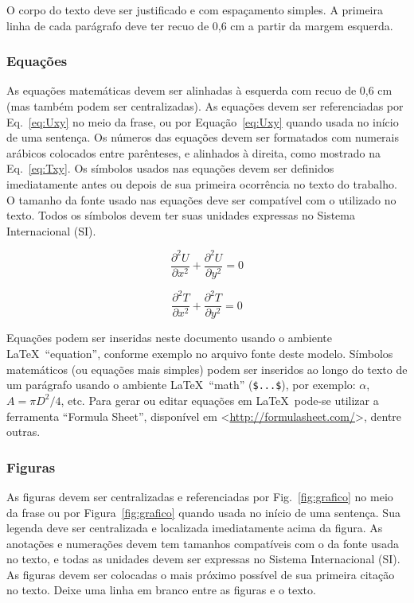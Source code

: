 \documentclass[%
  report,%
  10pt,%
  a4paper,%
  fleqn,%
  oneside,%
  sumario = tradicional,%
  chapter = TITLE,%
  section = TITLE,%
]{abntex2}
\begin{document}
O corpo do texto deve ser justificado e com espaçamento simples. A primeira linha de cada parágrafo deve ter recuo de 0,6 cm a partir da margem esquerda.

\subsubsection{Equações}\label{sssec:eqs}

As equações matemáticas devem ser alinhadas à esquerda com recuo de 0,6 cm (mas também podem ser centralizadas). As equações devem ser referenciadas por Eq.~\eqref{eq:Uxy} no meio da frase, ou por Equação~\eqref{eq:Uxy} quando usada no início de uma sentença. Os números das equações devem ser formatados com numerais arábicos colocados entre parênteses, e alinhados à direita, como mostrado na Eq.~\eqref{eq:Txy}. Os símbolos usados nas equações devem ser definidos imediatamente antes ou depois de sua primeira ocorrência no texto do trabalho. O tamanho da fonte usado nas equações deve ser compatível com o utilizado no texto. Todos os símbolos devem ter suas unidades expressas no Sistema Internacional (SI).

\begin{equation}\label{eq:Uxy}
\frac{\partial^2 U}{\partial x^2} + \frac{\partial^2 U}{\partial y^2} = 0
\end{equation}

\begin{equation}\label{eq:Txy}
\frac{\partial^2 T}{\partial x^2} + \frac{\partial^2 T}{\partial y^2} = 0
\end{equation}

Equações podem ser inseridas neste documento usando o ambiente \LaTeX\ ``equation'', conforme exemplo no arquivo fonte deste modelo. Símbolos matemáticos (ou equações mais simples) podem ser inseridos ao longo do texto de um parágrafo usando o ambiente \LaTeX\ ``math'' (\verb|$...$|), por exemplo: $\alpha$, $A = \pi D^{2} /4$, etc. Para gerar ou editar equações em \LaTeX\ pode-se utilizar a ferramenta ``Formula Sheet'', disponível em <\url{http://formulasheet.com/}>, dentre outras.

\subsubsection{Figuras}\label{sssec:figs}

As figuras devem ser centralizadas e referenciadas por Fig.~\ref{fig:grafico} no meio da frase ou por Figura~\ref{fig:grafico} quando usada no início de uma sentença. Sua legenda deve ser centralizada e localizada imediatamente acima da figura. As anotações e numerações devem tem tamanhos compatíveis com o da fonte usada no texto, e todas as unidades devem ser expressas no Sistema Internacional (SI). As figuras devem ser colocadas o mais próximo possível de sua primeira citação no texto. Deixe uma linha em branco entre as figuras e o texto.
\end{document}
